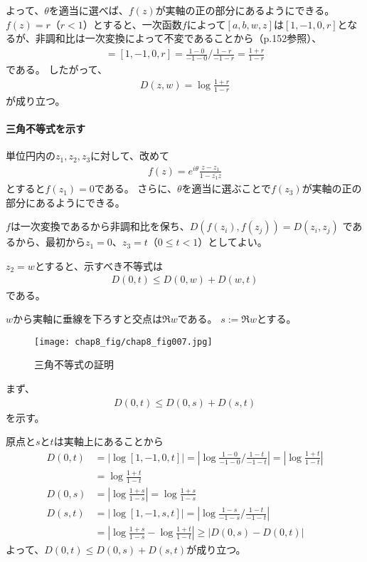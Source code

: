よって、$\theta$を適当に選べば、$f(z)$が実軸の正の部分にあるようにできる。
$f(z)=r$（$r<1$）とすると、一次函数$f$によって$[a,b,w,z]$は$[1,-1,0,r]$となるが、非調和比は一次変換によって不変であることから（p.152参照）、
\begin{align*}
    [a,b,w,z]=[1,-1,0,r]=\frac{1-0}{-1-0}\Bigg/\frac{1-r}{-1-r}=\frac{1+r}{1-r}
\end{align*}
である。
したがって、
\begin{align*}
    D(z,w)=\log\frac{1+r}{1-r}
\end{align*}
が成り立つ。


\paragraph{三角不等式を示す}
単位円内の$z_1,z_2,z_3$に対して、改めて
\begin{align*}
    f(z)=e^{i\theta}\frac{z-z_1}{1-\overline{z_1}z}
\end{align*}
とすると$f(z_1)=0$である。
さらに、$\theta$を適当に選ぶことで$f(z_3)$が実軸の正の部分にあるようにできる。

$f$は一次変換であるから非調和比を保ち、$D(f(z_i),f(z_j))=D(z_i,z_j)$
であるから、最初から$z_1=0$、$z_3=t$（$0\le t<1$）としてよい。

$z_2=w$とすると、示すべき不等式は
\begin{align*}
    D(0,t)\le D(0,w)+D(w,t)
\end{align*}
である。

$w$から実軸に垂線を下ろすと交点は$\Re w$である。
$s:=\Re w$とする。

\begin{figure}[h]
    \centering
    \texttt{[image: chap8\_fig/chap8\_fig007.jpg]}
    \caption{三角不等式の証明}
    \label{fig:chap8_tri}
\end{figure}

まず、
\begin{align*}
    D(0,t)\le D(0,s)+D(s,t)
\end{align*}
を示す。

原点と$s$と$t$は実軸上にあることから
\begin{align*}
    D(0,t)&=|\log[1,-1,0,t]|
    =\left|\log\frac{1-0}{-1-0}\Bigg/\frac{1-t}{-1-t}\right|
    =\left|\log\frac{1+t}{1-t}\right|\\
    &=\log\frac{1+t}{1-t}\\
    D(0,s)&=\left|\log\frac{1+s}{1-s}\right|=\log\frac{1+s}{1-s}\\
    D(s,t)&=|\log[1,-1,s,t]|
    =\left|\log\frac{1-s}{-1-s}\Bigg/\frac{1-t}{-1-t}\right|\\
    &=\left|\log\frac{1+s}{1-s}-\log\frac{1+t}{1-t}\right|
    \ge\left|D(0,s)-D(0,t)\right|
\end{align*}
よって、$D(0,t)\le D(0,s)+D(s,t)$が成り立つ。

